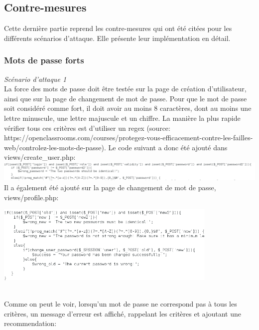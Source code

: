 \documentclass{article}
\begin{document}
\subsection{Contre-mesures}

Cette dernière partie reprend les contre-mesures qui ont été citées pour
les différents scénarios d'attaque. Elle présente leur implémentation en
détail.

\subsubsection{Mots de passe forts}

\textit{Scénario d'attaque 1}\\

La force des mots de passe doit être testée sur la page de création
d'utilisateur, ainsi que sur la page de changement de mot de passe. Pour
que le mot de passe soit considéré comme fort, il doit avoir au moins 8
caractères, dont au moins une lettre minuscule, une lettre majuscule et
un chiffre. La manière la plus rapide vérifier tous ces critères est
d'utiliser un regex (source:
https://openclassrooms.com/courses/protegez-vous-efficacement-contre-les-failles-web/controlez-les-mots-de-passe).
Le code suivant a donc été ajouté dans views/create\_user.php:\\

\includegraphics[width=\textwidth]{images/password.PNG}\\

Il a également été ajouté sur la page de changement de mot de passe,
views/profile.php:\\

\begin{center}\includegraphics[width=0.8\textwidth]{images/password3.PNG}\end{center}\\

Comme on peut le voir, lorsqu'un mot de passe ne correspond pas à tous
les critères, un message d'erreur est affiché, rappelant les critères et
ajoutant une recommendation:
\end{document}
